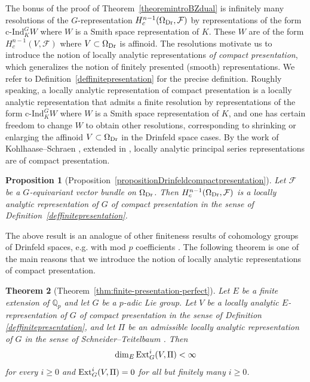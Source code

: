 \documentclass[a4paper,10pt]{amsart}
\newtheorem{theorem}{Theorem}[section]
\theoremstyle{remark}
\theoremstyle{definition}
\theoremstyle{plain}
\newtheorem{proposition}[theorem]{Proposition}
\numberwithin{equation}{section}
\newcommand{\bbQ}{{\mathbb Q}}
\newcommand{\calF}{{\mathcal F}}
\newcommand{\Ext}{{\rm Ext}}
\newcommand{\cInd}{\mathrm{c\text{-}Ind}}
\begin{document}
The bonus of the proof of Theorem~\ref{theoremintroBZdual} is infinitely many resolutions of the $G$-representation $H_c^{n-1}(\Omega_{\rm Dr},\calF)$ by representations of the form $\cInd_K^GW$ where $W$ is a Smith space representation of $K$. These $W$ are of the form $H_c^{n-1}(V,\calF)$ where $V\subset \Omega_{\rm Dr}$ is affinoid. The resolutions motivate us to introduce the notion of locally analytic representations \emph{of compact presentation}, which generalizes the notion of finitely presented (smooth) representations. We refer to Definition~\ref{deffinitepresentation} for the precise definition. Roughly speaking, a locally analytic representation of compact presentation is a locally analytic representation that admits a finite resolution by representations of the form $\cInd_K^GW$ where $W$ is a Smith space representation of $K$, and one has certain freedom to change $W$ to obtain other resolutions, corresponding to shrinking or enlarging the affinoid $V\subset \Omega_{\rm Dr}$ in the Drinfeld space cases. By the work of Kohlhaase--Schraen \cite{kohlhaase2012homological}, extended in \cite{strauch2025bernsteinzelevinskydualitylocallyanalytic}, locally analytic principal series representations are of compact presentation.
\begin{proposition}[Proposition~\ref{propositionDrinfeldcompactpresentation}]\label{intropropositionDrinfeldcompactpresentation}
	Let $\calF$ be a $G$-equivariant vector bundle on $\Omega_{\rm Dr}$. Then $H_c^{n-1}(\Omega_{\rm Dr},\calF)$ is a locally analytic representation of $G$ of compact presentation in the sense of Definition~\ref{deffinitepresentation}.
\end{proposition}
The above result is an analogue of other finiteness results of cohomology groups of Drinfeld spaces, e.g. with mod $p$ coefficients \cite[Thm.~0.5]{colmezDospinescuNiziol2023factorisation}. The following theorem is one of the main reasons that we introduce the notion of locally analytic representations of compact presentation.
\begin{theorem}[Theorem~\ref{thm:finite-presentation-perfect}]\label{theoremintrofiniteness}
	Let $E$ be a finite extension of $\bbQ_p$ and let $G$ be a $p$-adic Lie group. Let $V$ be a locally analytic $E$-representation of $G$ of compact presentation in the sense of Definition \ref{deffinitepresentation},
	and let $\Pi$ be an admissible locally analytic representation of $G$ in the sense of Schneider--Teitelbaum \cite{ST03}. Then
	\[\dim_E\Ext^i_{G}(V,\Pi)<\infty\] 
	for every $i\geq 0$ and $\Ext^i_{G}(V,\Pi)= 0$ for all but finitely many $i\geq 0$.
\end{theorem}
\end{document}
